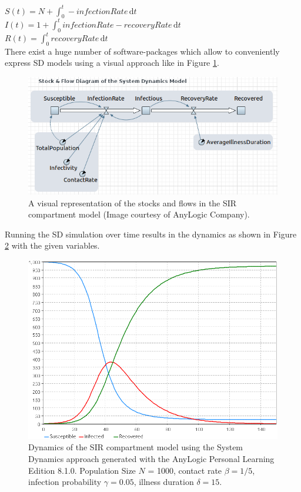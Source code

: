 $S(t) = N + \int_0^t -infectionRate\, \mathrm{d}t$ \\
$I(t) = 1 + \int_0^t infectionRate - recoveryRate\, \mathrm{d}t$ \\
$R(t) = \int_0^t recoveryRate\, \mathrm{d}t$ \\

There exist a huge number of software-packages which allow to conveniently express SD models using a visual approach like in Figure \ref{fig:sir_sd_stockflow_diagramm}.

\begin{figure}
	\centering
	\includegraphics[width=.4\textwidth, angle=0]{./fig/SIR_SD_STOCKFLOW_DIAGRAMM.png}
	\caption{A visual representation of the stocks and flows in the SIR compartment model (Image courtesy of AnyLogic Company).}
	\label{fig:sir_sd_stockflow_diagramm}
\end{figure}

Running the SD simulation over time results in the dynamics as shown in Figure \ref{fig:sir_sd_dynamics_anylogic} with the given variables.

\begin{figure}
	\centering
	\includegraphics[width=.4\textwidth, angle=0]{./fig/SIR_SD_DYNAMICS_ANYLOGIC.png}
	\caption{Dynamics of the SIR compartment model using the System Dynamics approach generated with the AnyLogic Personal Learning Edition 8.1.0. Population Size $N$ = 1000, contact rate $\beta = 1/5$, infection probability $\gamma = 0.05$, illness duration $\delta = 15$.}
	\label{fig:sir_sd_dynamics_anylogic}
\end{figure}

